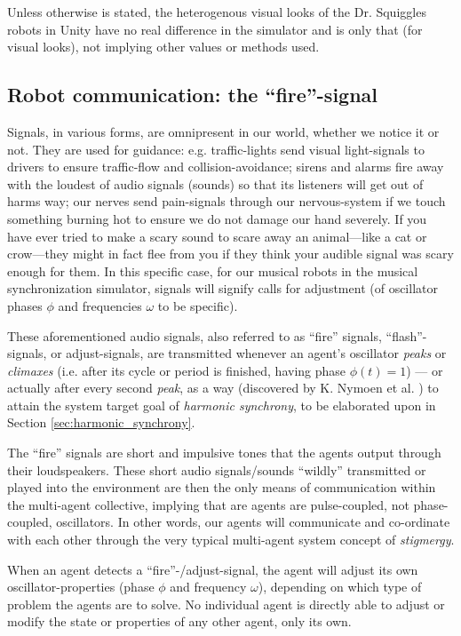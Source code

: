 	Unless otherwise is stated, the heterogenous visual looks of the Dr. Squiggles robots in Unity have no real difference in the simulator and is only that (for visual looks), not implying other values or methods used.

	
	\subsection{Robot communication: the ``fire''-signal}
	\label{subsec:fire_signal}
	
	Signals, in various forms, are omnipresent in our world, whether we notice it or not. They are used for guidance: e.g. traffic-lights send visual light-signals to drivers to ensure traffic-flow and collision-avoidance; sirens and alarms fire away with the loudest of audio signals (sounds) so that its listeners will get out of harms way; our nerves send pain-signals through our nervous-system if we touch something burning hot to ensure we do not damage our hand severely. If you have ever tried to make a scary sound to scare away an animal—like a cat or crow—they might in fact flee from you if they think your audible signal was scary enough for them. In this specific case, for our musical robots in the musical synchronization simulator, signals will signify calls for adjustment (of oscillator phases $\phi$ and frequencies $\omega$ to be specific).

	These aforementioned audio signals, also referred to as ``fire'' signals, ``flash''-signals, or adjust-signals, are transmitted whenever an agent's oscillator \textit{peaks} or \textit{climaxes} (i.e. after its cycle or period is finished, having phase $\phi(t)=1$) — or actually after every second \textit{peak}, as a way (discovered by K. Nymoen et al. \cite{nymoen_synch}) to attain the system target goal of \textit{harmonic synchrony}, to be elaborated upon in Section \ref{sec:harmonic_synchrony}.

	The ``fire'' signals are short and impulsive tones that the agents output through their loudspeakers. These short audio signals/sounds ``wildly'' transmitted or played into the environment are then the only means of communication within the multi-agent collective, implying that are agents are pulse-coupled, not phase-coupled, oscillators. In other words, our agents will communicate and co-ordinate with each other through the very typical multi-agent system concept of \textit{stigmergy}.

	When an agent detects a ``fire''-/adjust-signal, the agent will adjust its own oscillator-properties (phase $\phi$ and frequency $\omega$), depending on which type of problem the agents are to solve. No individual agent is directly able to adjust or modify the state or properties of any other agent, only its own.
	
